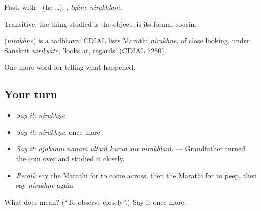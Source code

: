 Past, with - (he …):  , \emph{tyāne nirakhlaṁ}.

Transitive: the thing studied is the object.   is its formal cousin.

\begin{cousinweb}
\textbf{} (\emph{nirakhṇe}) is a tadbhava: CDIAL lists Marathi \emph{nirakhṇe}, of close looking, under Sanskrit \emph{nirīkṣate}, 'looks at, regards' (CDIAL 7280).
\end{cousinweb}

\begin{grammarlens}[title={What you've built}]
One more word for telling what happened.
\end{grammarlens}

\subsection*{Your turn}
\begin{itemize}
\raggedright
  \item \emph{Say it:} \emph{nirakhṇe}
  \item \emph{Say it:} \emph{nirakhṇe}, once more
  \item \emph{Say it:} \emph{ājobānnī nāṇaṁ ulṭaṁ karūn nīṭ nirakhlaṁ.} — Grandfather turned the coin over and studied it closely.
  \item \emph{Recall:} say the Marathi for to come across, then the Marathi for to peep, then say \emph{nirakhṇe} again
\end{itemize}

\begin{tcolorbox}[breakable,colback=teal!4,colframe=teal!35!black,title={Before you move on}]
What does  mean? (\textquotedblleft{}To observe closely\textquotedblright{}.) Say it once more.
\end{tcolorbox}
